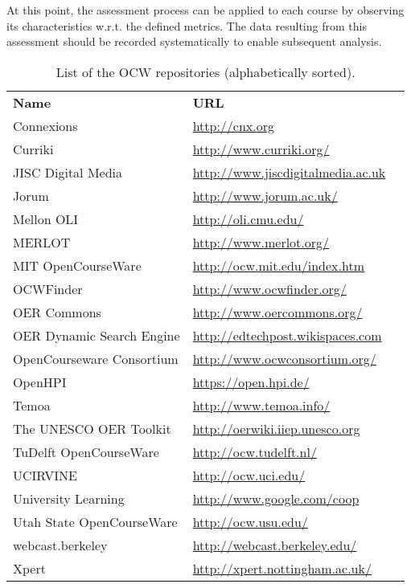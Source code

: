 \documentclass{sig-alternate}
\theoremstyle{definition}
\begin{document}
At this point, the assessment process can be applied to each course by observing its characteristics w.r.t. the defined metrics.
The data resulting from this assessment should be recorded systematically to enable subsequent analysis.

\begin{table}[ht]
\centering
\scriptsize
\begin{tabular}{p{3cm}p{4.5cm}p{3cm}}\hline
\textbf{Name} & \textbf{URL} \\Connexions & \url{http://cnx.org} \\
Curriki & \url{http://www.curriki.org/} \\
JISC Digital Media & \url{http://www.jiscdigitalmedia.ac.uk} \\
Jorum & \url{http://www.jorum.ac.uk/} \\
Mellon OLI & \url{http://oli.cmu.edu/} \\
MERLOT & \url{http://www.merlot.org/} \\
MIT OpenCourseWare & \url{http://ocw.mit.edu/index.htm} \\
OCWFinder & \url{http://www.ocwfinder.org/} \\
OER Commons & \url{http://www.oercommons.org/} \\
OER Dynamic Search Engine & \url{http://edtechpost.wikispaces.com} \\
OpenCourseware Consortium & \url{http://www.ocwconsortium.org/} \\
OpenHPI & \url{https://open.hpi.de/} \\
Temoa & \url{http://www.temoa.info/} \\
The UNESCO OER Toolkit & \url{http://oerwiki.iiep.unesco.org} \\
TuDelft OpenCourseWare & \url{http://ocw.tudelft.nl/} \\
UCIRVINE & \url{http://ocw.uci.edu/} \\
University Learning & \url{http://www.google.com/coop} \\
Utah State OpenCourseWare & \url{http://ocw.usu.edu/} \\
webcast.berkeley & \url{http://webcast.berkeley.edu/} \\
Xpert & \url{http://xpert.nottingham.ac.uk/} \\
\end{tabular}
\caption{List of the OCW repositories (alphabetically sorted).}
\label{tab:oer-repo}
\end{table}
\end{document}
